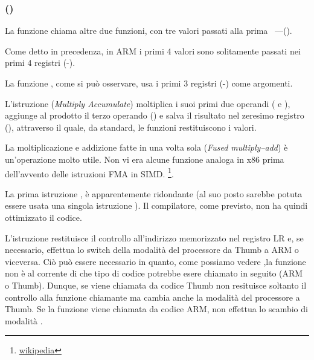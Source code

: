 \subsubsection{\NonOptimizingKeilVI (\ARMMode)}



La funzione \main chiama altre due funzioni, con tre valori passati alla prima ~---(\ttf).

Come detto in precedenza, in ARM i primi 4 valori sono solitamente passati nei primi 4 registri (-).

La funzione \ttf, come si può osservare, usa i primi 3 registri (-) come argomenti.

L'istruzione  (\emph{Multiply Accumulate}) 
moltiplica i suoi primi due operandi ( e ), aggiunge al prodotto il terzo operando () e salva il risultato
nel zeresimo registro (), attraverso il quale, da standard, le funzioni restituiscono i valori.

La moltiplicazione e addizione fatte in una volta sola (\emph{Fused multiply–add}) è un'operazione molto utile. 
Non vi era alcune funzione analoga in x86 prima dell'avvento delle istruzioni FMA in SIMD.
\footnote{\href{http://go.yurichev.com/17103}{wikipedia}}.

La prima istruzione , 
è apparentemente ridondante (al suo posto sarebbe potuta essere usata una singola istruzione ). 
Il compilatore, come previsto, non ha quindi ottimizzato il codice.


L'istruzione  restituisce il controllo all'indirizzo memorizzato nel registro \ac{LR} e, se necessario, 
effettua lo switch della modalità del processore da Thumb a ARM o viceversa.
Ciò può essere necessario in quanto, come possiamo vedere ,la funzione \ttf non è al corrente di che tipo di codice potrebbe esere chiamato in seguito (ARM o Thumb).
Dunque, se viene chiamata da codice Thumb  non resituisce soltanto il controllo alla funzione chiamante ma cambia anche la modalità del processore a Thumb. 
Se la funzione viene chiamata da codice ARM, non effettua lo scambio di modalità .
